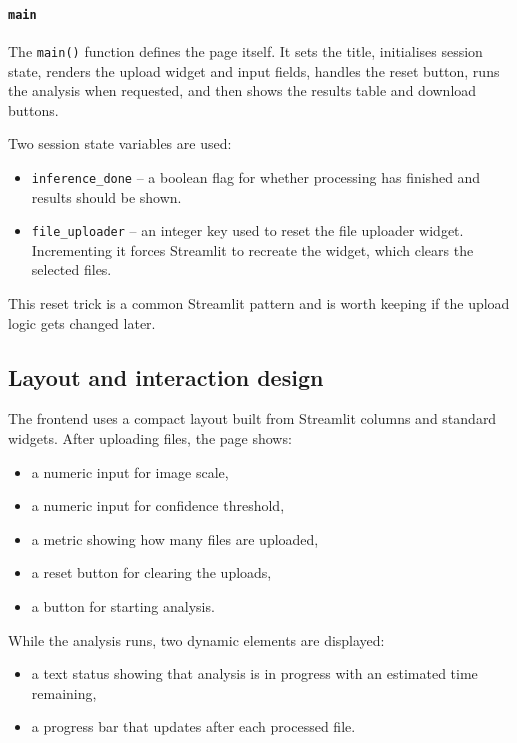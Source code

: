 \documentclass{article}
\begin{document}
\paragraph{\texttt{main}}
The \texttt{main()} function defines the page itself. It sets the title, initialises session state, renders the upload widget and input fields, handles the reset button, runs the analysis when requested, and then shows the results table and download buttons.

Two session state variables are used:

\begin{itemize}
    \item \texttt{inference\_done} -- a boolean flag for whether processing has finished and results should be shown.
    \item \texttt{file\_uploader} -- an integer key used to reset the file uploader widget. Incrementing it forces Streamlit to recreate the widget, which clears the selected files.
\end{itemize}

This reset trick is a common Streamlit pattern and is worth keeping if the upload logic gets changed later.

\subsection{Layout and interaction design}

The frontend uses a compact layout built from Streamlit columns and standard widgets. After uploading files, the page shows:

\begin{itemize}
    \item a numeric input for image scale,
    \item a numeric input for confidence threshold,
    \item a metric showing how many files are uploaded,
    \item a reset button for clearing the uploads,
    \item a button for starting analysis.
\end{itemize}

While the analysis runs, two dynamic elements are displayed:

\begin{itemize}
    \item a text status showing that analysis is in progress with an estimated time remaining,
    \item a progress bar that updates after each processed file.
\end{itemize}
\end{document}
